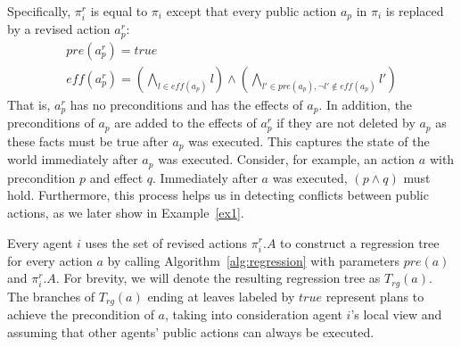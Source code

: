 \documentclass[letterpaper]{article}
\newcommand{\eff}{\textit{eff}}
\newcommand{\pre}{\textit{pre}}
\theoremstyle{definition}
\begin{document}
Specifically, $\pi_i^r$ is equal to $\pi_i$ except that every public action $a_p$ in $\pi_i$ is replaced by a revised action $a^r_p$:
\begin{eqnarray}
& \pre(a^r_p)=true &\\
& \eff(a^r_p)=\displaystyle\left(\bigwedge_{l \in \eff(a_p)}l\right) \wedge \left(\bigwedge_{l' \in \pre(a_p), \neg l' \not\in \eff(a_p)}l'\right)&
\end{eqnarray}
That is, $a^r_p$ has no preconditions and has the effects of $a_p$.
In addition, the preconditions of $a_p$ are added to the effects of $a^r_p$ if they are not deleted by $a_p$ as these facts must be true after $a_p$ was executed.
This captures the state of the world immediately after $a_p$ was executed. Consider, for example, an action $a$ with precondition $p$ and effect $q$. Immediately after $a$ was executed, $(p \wedge q)$ must hold. Furthermore, this process helps us in detecting conflicts between public actions, as we later show in Example~\ref{ex1}.


Every agent $i$ uses the set of revised actions $\pi_i^r.A$ to construct a regression tree for every action $a$ by calling Algorithm~\ref{alg:regression} with parameters $\pre(a)$ and $\pi_i^r.A$. For brevity, we will denote the resulting regression tree as $T_{rg}(a)$. The branches of $T_{rg}(a)$ ending at leaves labeled by $true$ represent plans to achieve the precondition of $a$, taking into consideration agent $i$'s local view and assuming that other agents' public actions can always be executed.
\end{document}
